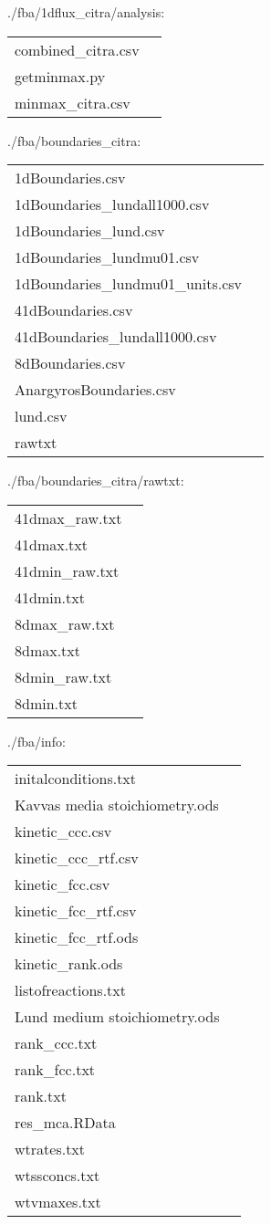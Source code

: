 \documentclass[a4paper, parskip=full]{scrreprt}
\begin{document}
./fba/1dflux\_citra/analysis:

\begin{longtable}{ll}
combined\_citra.csv\\
getminmax.py\\
minmax\_citra.csv
\end{longtable}

./fba/boundaries\_citra:

\begin{longtable}{ll}
1dBoundaries.csv\\
1dBoundaries\_lundall1000.csv\\
1dBoundaries\_lund.csv\\
1dBoundaries\_lundmu01.csv\\
1dBoundaries\_lundmu01\_units.csv\\
41dBoundaries.csv\\
41dBoundaries\_lundall1000.csv\\
8dBoundaries.csv\\
AnargyrosBoundaries.csv\\
lund.csv\\
rawtxt
\end{longtable}

./fba/boundaries\_citra/rawtxt:

\begin{longtable}{ll}
41dmax\_raw.txt\\
41dmax.txt\\
41dmin\_raw.txt\\
41dmin.txt\\
8dmax\_raw.txt\\
8dmax.txt\\
8dmin\_raw.txt\\
8dmin.txt
\end{longtable}

./fba/info:

\begin{longtable}{ll}
initalconditions.txt\\
Kavvas media stoichiometry.ods\\
kinetic\_ccc.csv\\
kinetic\_ccc\_rtf.csv\\
kinetic\_fcc.csv\\
kinetic\_fcc\_rtf.csv\\
kinetic\_fcc\_rtf.ods\\
kinetic\_rank.ods\\
listofreactions.txt\\
Lund medium stoichiometry.ods\\
rank\_ccc.txt\\
rank\_fcc.txt\\
rank.txt\\
res\_mca.RData\\
wtrates.txt\\
wtssconcs.txt\\
wtvmaxes.txt
\end{longtable}
\end{document}
